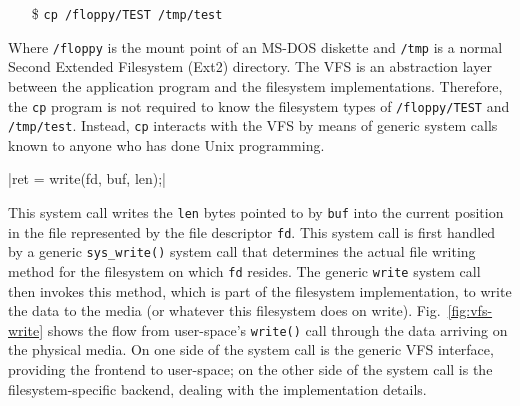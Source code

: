 \begin{frame}
  \begin{itemize}
  \item[\$] \texttt{cp /floppy/TEST /tmp/test}
  \end{itemize}
  \vspace{2em}
  \begin{minipage}{.3\linewidth}
    \begin{center}
       
    \end{center}
  \end{minipage}\quad
  \begin{minipage}{.65\linewidth}
    \begin{center}
    \end{center}
  \end{minipage}
\end{frame}

Where \texttt{/floppy} is the mount point of an MS-DOS diskette and \texttt{/tmp} is a
normal Second Extended Filesystem (Ext2) directory. The VFS is an abstraction layer
between the application program and the filesystem implementations. Therefore, the
\texttt{cp} program is not required to know the filesystem types of \texttt{/floppy/TEST}
and \texttt{/tmp/test}. Instead, \texttt{cp} interacts with the VFS by means of generic
system calls known to anyone who has done Unix
programming.

\begin{frame}[fragile]
  |ret = write(fd, buf, len);|
  \begin{center}
  \end{center}
\end{frame}

This system call writes the \texttt{len} bytes pointed to by \texttt{buf} into the current
position in the file represented by the file descriptor \texttt{fd}. This system call is
first handled by a generic \verb|sys_write()| system call that determines the actual file
writing method for the filesystem on which \texttt{fd} resides. The generic \texttt{write}
system call then invokes this method, which is part of the filesystem implementation, to
write the data to the media (or whatever this filesystem does on
write). Fig.~\ref{fig:vfs-write} shows the flow from user-space's \texttt{write()} call
through the data arriving on the physical media. On one side of the system call is the
generic VFS interface, providing the frontend to user-space; on the other side of the
system call is the filesystem-specific backend, dealing with the implementation
details.

